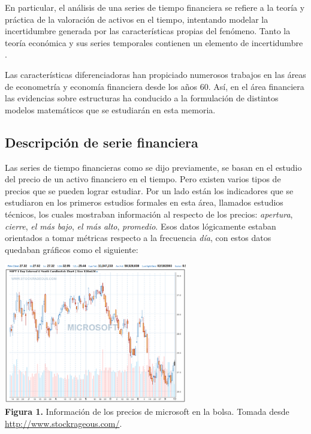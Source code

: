 En particular, el análisis de una series de tiempo financiera se refiere a la teoría y práctica de la valoración 
de activos en el tiempo, intentando modelar la incertidumbre generada por las características propias del fenómeno. Tanto la teoría económica 
y sus series temporales contienen un elemento de incertidumbre \cite{tsay2005analysis}. 

Las características diferenciadoras han propiciado numerosos trabajos en las áreas de econometría y economía financiera desde los años 60.
Así, en el área financiera las evidencias sobre estructuras ha conducido a la formulación de distintos modelos matemáticos que se estudiarán
en esta memoria.

\subsection{Descripción de serie financiera}

Las series de tiempo financieras como se dijo previamente, se basan en el estudio del precio de un activo financiero en el tiempo. Pero existen 
varios tipos de precios que se pueden lograr estudiar. Por un lado están los indicadores que se estudiaron en los primeros estudios formales
en esta área, llamados estudios técnicos, los cuales mostraban información al respecto de los precios: \emph{apertura}, \emph{cierre}, \emph{el más bajo}, 
\emph{el más alto}, \emph{promedio}. Esos datos lógicamente estaban orientados a tomar métricas respecto a la frecuencia \emph{día}, con estos
datos quedaban gráficos como el siguiente:

\begin{center}
	\includegraphics[width=0.6\textwidth]{images/microsoft} \\
	\textbf{Figura 1.} Información de los precios de microsoft en la bolsa. Tomada desde \url{http://www.stockrageous.com/}.
\end{center}

